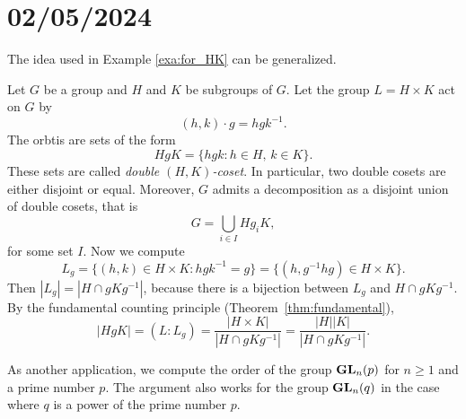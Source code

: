 \section{02/05/2024}


The idea used in Example \ref{exa:for_HK} can be generalized. 

\begin{example}
Let $G$ be a group and $H$ and $K$ be subgroups of $G$. Let the group $L=H\times K$ act on $G$ by
\[
(h,k)\cdot g=hgk^{-1}.
\]
The orbtis are sets of the form 
\[
HgK=\{hgk:h\in H,\,k\in K\}.
\]
These sets are called \emph{double $(H,K)$-coset}. 
In particular, two double cosets are either disjoint 
or equal. Moreover, $G$ admits a decomposition 
as a disjoint union of double cosets, that is 
\[
G=\bigcup_{i\in I}Hg_iK,
\]
for some set $I$. Now we compute 
\[
L_g=\{(h,k)\in H\times K:hgk^{-1}=g\}=\{(h,g^{-1}hg)\in H\times K\}.
\]
Then $|L_g|=|H\cap gKg^{-1}|$, because there is a bijection between $L_g$ and
$H\cap gKg^{-1}$. By the fundamental counting principle (Theorem~\ref{thm:fundamental}), 
\[
|HgK|=(L:L_g)=\frac{|H\times K|}{|H\cap gKg^{-1}|}=\frac{|H||K|}{|H\cap gKg^{-1}|}.
\]
\end{example}

As another application, we compute the
order of the group $\mathbf{GL}_n(p)$ for $n\geq1$ and 
a prime number $p$. 
The argument also works for
the group $\mathbf{GL}_n(q)$ in the case where
$q$ is a power of the prime number $p$.

